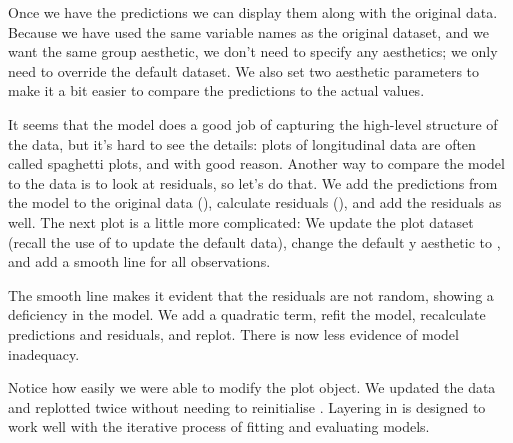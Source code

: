 Once we have the predictions we can display them along with the original data.  Because we have used the same variable names as the original  dataset, and we want the same group aesthetic, we don't need to specify any aesthetics; we only need to override the default dataset.  We also set two aesthetic parameters to make it a bit easier to compare the predictions to the actual values.

% 


It seems that the model does a good job of capturing the high-level structure of the data, but it's hard to see the details: plots of longitudinal data are often called spaghetti plots, and with good reason.  Another way to compare the model to the data is to look at residuals, so let's do that.  We add the predictions from the model to the original data (), calculate residuals (), and add the residuals as well.  The next plot is a little more complicated: We update the plot dataset (recall the use of \code{\%+\%} to update the default data), change the default y aesthetic to , and add a smooth line for all observations.

% 
% 


The smooth line makes it evident that the residuals are not random, showing a deficiency in the model.  We add a quadratic term, refit the model, recalculate predictions and residuals, and replot.  There is now less evidence of model inadequacy.

% 
% 


Notice how easily we were able to modify the plot object.  We updated the data and replotted twice without needing to reinitialise .  Layering in \ggplot is designed to work well with the iterative process of fitting and evaluating models.


